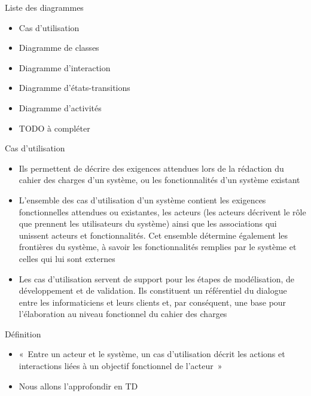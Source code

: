 \documentclass[14pt]{beamer}
\begin{document}
\begin{framentitle}{Liste des diagrammes}
    \begin{itemize}
        \item Cas d'utilisation
        \item Diagramme de classes
        \item Diagramme d'interaction
        \item Diagramme d'états-transitions
        \item Diagramme d'activités
        \item TODO à compléter
    \end{itemize}
\end{framentitle}


\begin{framentitle}{Cas d'utilisation}
    \begin{itemize}
        \item Ils permettent de décrire des exigences attendues lors de la
            rédaction du cahier des charges d'un système, ou les fonctionnalités
            d'un système existant
        \item L'ensemble des cas d'utilisation d'un système contient les
            exigences fonctionnelles attendues ou existantes, les acteurs (les
            acteurs décrivent le rôle que prennent les utilisateurs du système)
            ainsi que les associations qui unissent acteurs et fonctionnalités.
            Cet ensemble détermine également les frontières du système, à savoir
            les fonctionnalités remplies par le système et celles qui lui sont
            externes
        \item Les cas d'utilisation servent de support pour les étapes de
            modélisation, de développement et de validation. Ils constituent un
            référentiel du dialogue entre les informaticiens et leurs clients et,
            par conséquent, une base pour l'élaboration au niveau fonctionnel du
            cahier des charges
    \end{itemize}
\end{framentitle}


\begin{framentitle}{Définition}
    \begin{itemize}
        \item «~Entre un acteur et le système, un cas d'utilisation décrit les
            actions et interactions liées à un objectif fonctionnel de
            l'acteur~»
        \item Nous allons l'approfondir en TD
    \end{itemize}
\end{framentitle}
\end{document}
